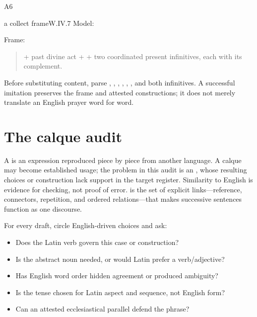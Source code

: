 \begin{courseunit}{A6}
\begin{workedexample}{a collect frame}{W.IV.7}
Model: 

Frame:
\begin{quote}
 + past divine act +  + two coordinated
present infinitives, each with its complement.
\end{quote}

Before substituting content, parse , ,
, , , , and both
infinitives. A successful imitation preserves the frame and attested
constructions; it does not merely translate an English prayer word for word.
\end{workedexample}

\section{The calque audit}

A  is an expression reproduced piece by piece from another
language. A calque may become established usage; the problem in this audit is
an , whose resulting choices or construction lack
support in the target register. Similarity to English is evidence for checking,
not proof of error.  is the set of explicit links---reference,
connectors, repetition, and ordered relations---that makes successive
sentences function as one discourse.

For every draft, circle English-driven choices and ask:

\begin{itemize}
  \item Does the Latin verb govern this case or construction?
  \item Is the abstract noun needed, or would Latin prefer a verb/adjective?
  \item Has English word order hidden agreement or produced ambiguity?
  \item Is the tense chosen for Latin aspect and sequence, not English form?
  \item Can an attested ecclesiastical parallel defend the phrase?
\end{itemize}



\end{courseunit}

